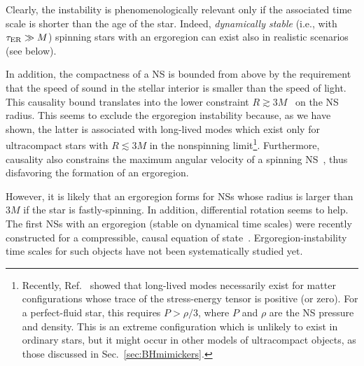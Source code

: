 \documentclass[11pt]{article}
\numberwithin{equation}{section} %
\begin{document}
Clearly, the instability is phenomenologically relevant only if the associated time scale is shorter than the age of the 
star. Indeed, \emph{dynamically stable} (i.e., with $\tau_{\rm ER}\gg M$) spinning stars with an ergoregion can exist 
also in realistic scenarios~\cite{Tsokaros:2019mlz} (see below).

In addition, the compactness of a NS is bounded from above by the requirement that the speed of sound in the stellar 
interior is smaller than the speed of light. This causality bound translates into the lower constraint $R\gtrsim 3 
M$~\cite{Lattimer:1990zz,Glendenning:1992vb} on the NS radius. This seems to exclude the ergoregion instability because, 
as we have shown, the latter is associated with long-lived modes which exist only for ultracompact stars with $R\lesssim 
3M$ in the nonspinning limit\footnote{
Recently, Ref.~\cite{Hod:2014ena} showed that long-lived modes necessarily exist for matter configurations whose trace of the stress-energy tensor is positive (or zero). For a perfect-fluid star, this requires $P>\rho/3$, where $P$ and $\rho$ are the NS pressure and density. This is an extreme configuration which is unlikely to exist in ordinary stars, but it might occur in other models of ultracompact objects, as those discussed in Sec.~\ref{sec:BHmimickers}.}. Furthermore, causality also constrains the maximum angular velocity of a spinning NS~\cite{Koranda:1996jm}, thus disfavoring the formation of an ergoregion. 


However, it is likely that an ergoregion forms for NSs whose radius is larger than $3M$ if the star is fastly-spinning. 
In addition, differential rotation seems to help. The first NSs with an ergoregion (stable on dynamical time scales) 
were recently constructed for a compressible, causal equation of state~\cite{Tsokaros:2019mlz}. Ergoregion-instability 
time scales for such objects have not been systematically studied yet.

\end{document}
